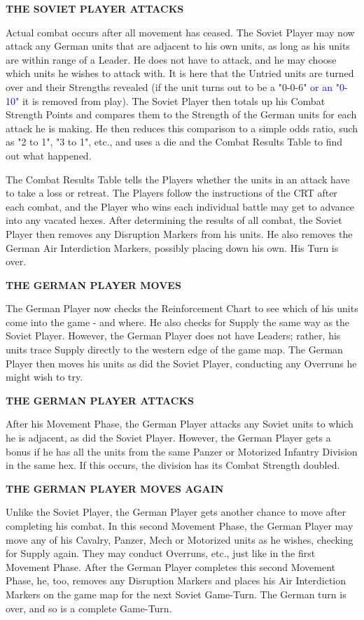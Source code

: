\textbf{THE SOVIET PLAYER ATTACKS}

Actual combat occurs after all movement has ceased. The Soviet Player may now attack any German units that are adjacent to his own units, as long as his units are within range of a Leader. He does not have to attack, and he may choose which units he wishes to attack with. It is here that the Untried units are turned over and their Strengths revealed (if the unit turns out to be a "0-0-6"\textcolor{blue}{ or an "0-10"} it is removed from play). The Soviet Player then totals up his Combat Strength Points and compares them to the Strength of the German units for each attack he is making. He then reduces this comparison to a simple odds ratio, such as "2 to 1", "3 to 1", etc., and uses a die and the Combat Results Table to find out what happened.

The Combat Results Table tells the Players whether the units in an attack have to take a loss or retreat. The Players follow the instructions of the CRT after each combat, and the Player who wins each individual battle may get to advance into any vacated hexes. After determining the results of all combat, the Soviet Player then removes any Disruption Markers from his units. He also removes the German Air Interdiction Markers, possibly placing down his own. His Turn is over.

\textbf{THE GERMAN PLAYER MOVES}

The German Player now checks the Reinforcement Chart to see which of his units come into the game - and where. He also checks for Supply the same way as the Soviet Player. However, the German Player does not have Leaders; rather, his units trace Supply directly to the western edge of the game map. The German Player then moves his units as did the Soviet Player, conducting any Overruns he might wish to try.

\textbf{THE GERMAN PLAYER ATTACKS}

After his Movement Phase, the German Player attacks any Soviet units to which he is adjacent, as did the Soviet Player. However, the German Player gets a bonus if he has all the units from the same Panzer or Motorized Infantry Division in the same hex. If this occurs, the division has its Combat Strength doubled.

\begin{flushleft}
  \textbf{THE GERMAN PLAYER MOVES AGAIN}
\end{flushleft}

Unlike the Soviet Player, the German Player gets another chance to move after completing his combat. In this second Movement Phase, the German Player may move any of his Cavalry, Panzer, Mech or Motorized units as he wishes, checking for Supply again. They may conduct Overruns, etc., just like in the first Movement Phase. After the German Player completes this second Movement Phase, he, too, removes any Disruption Markers and places his Air Interdiction Markers on the game map for the next Soviet Game-Turn. The German turn is over, and so is a complete Game-Turn.

